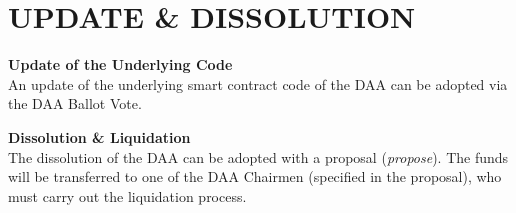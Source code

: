 \section{UPDATE \& DISSOLUTION}\label{sec:update-&-dissolution}

\item \textbf{Update of the Underlying Code} \\
An update of the underlying smart contract code of the DAA can be adopted via the DAA Ballot Vote.

\item \textbf{Dissolution \& Liquidation} \\
The dissolution of the DAA can be adopted with a proposal (\emph{propose}).
The funds will be transferred to one of the DAA Chairmen (specified in the proposal), who must carry out the liquidation process.
